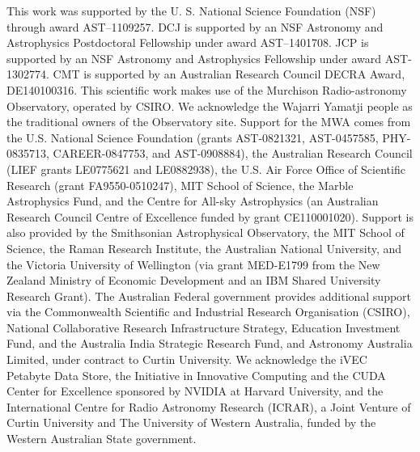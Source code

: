 \documentclass[twolcolumn,iop]{emulateapj}
\def\dilloncite{Dillon et al 2015 }
\begin{document}




\acknowledgments

This work was supported	 by the U. S. National Science Foundation (NSF) through award AST--1109257. DCJ is supported by an NSF Astronomy and Astrophysics Postdoctoral Fellowship under award AST--1401708. JCP is supported by an NSF Astronomy and Astrophysics Fellowship under award AST-1302774. CMT is supported by an Australian Research Council DECRA Award, DE140100316. This scientific work makes use of the Murchison Radio-astronomy Observatory, operated by CSIRO. We acknowledge the Wajarri Yamatji people as the traditional owners of the Observatory site. Support for the MWA comes from the U.S. National Science Foundation (grants AST-0821321, AST-0457585, PHY-0835713, CAREER-0847753, and AST-0908884), the Australian Research Council (LIEF grants LE0775621 and LE0882938), the U.S. Air Force Office of Scientific Research (grant FA9550-0510247), MIT School of Science, the Marble Astrophysics Fund, and the Centre for All-sky Astrophysics (an Australian Research Council Centre of Excellence funded by grant CE110001020). Support is also provided by the Smithsonian Astrophysical Observatory, the MIT School of Science, the Raman Research Institute, the Australian National University, and the Victoria University of Wellington (via grant MED-E1799 from the New Zealand Ministry of Economic Development and an IBM Shared University Research Grant). The Australian Federal government provides additional support via the Commonwealth Scientific and Industrial Research Organisation (CSIRO), National Collaborative Research Infrastructure Strategy, Education Investment Fund, and the Australia India Strategic Research Fund, and Astronomy Australia Limited, under contract to Curtin University. We acknowledge the iVEC Petabyte Data Store, the Initiative in Innovative Computing and the CUDA Center for Excellence sponsored by NVIDIA at Harvard University, and the International Centre for Radio Astronomy Research (ICRAR), a Joint Venture of Curtin University and The University of Western Australia, funded by the Western Australian State government.

\end{document}
